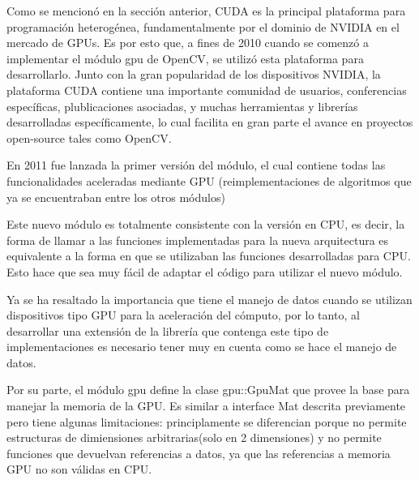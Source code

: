 \documentclass[a4paper,10pt]{report}
\begin{document}

Como se mencionó en la sección anterior, CUDA es la principal plataforma para programación heterogénea, fundamentalmente por el dominio de NVIDIA en el mercado de GPUs.
Es por esto que, a fines de 2010 cuando se comenzó a implementar el módulo gpu de OpenCV, se utilizó esta plataforma para desarrollarlo. 
Junto con la gran popularidad de los dispositivos NVIDIA, la plataforma CUDA contiene una importante comunidad de usuarios, conferencias específicas, plublicaciones asociadas, y muchas herramientas y librerías desarrolladas específicamente, lo cual facilita en gran parte el avance en proyectos open-source tales como OpenCV.

En 2011 fue lanzada la primer versión del módulo, el cual contiene todas las funcionalidades aceleradas mediante GPU (reimplementaciones de algoritmos que ya se encuentraban entre los otros módulos) 

Este nuevo módulo es totalmente consistente con la versión en CPU, es decir, la forma de llamar a las funciones implementadas para la nueva arquitectura es equivalente a la forma en que se utilizaban las funciones desarrolladas para CPU.
Esto hace que sea muy fácil de adaptar el código para utilizar el nuevo módulo.


Ya se ha resaltado la importancia que tiene el manejo de datos cuando se utilizan dispositivos tipo GPU para la aceleración del cómputo, por lo tanto, al desarrollar una extensión de la librería que contenga este tipo de implementaciones es necesario tener muy en cuenta como se hace el manejo de datos.

Por su parte, el módulo gpu define la clase gpu::GpuMat que provee la base para manejar la memoria de la GPU. Es similar a interface Mat descrita previamente pero tiene algunas limitaciones:
principlamente se diferencian porque no permite estructuras de dimiensiones arbitrarias(solo en 2 dimensiones) y no permite funciones que devuelvan referencias a datos, ya que las referencias a memoria GPU no son válidas en CPU.
% 
% 
\end{document}
